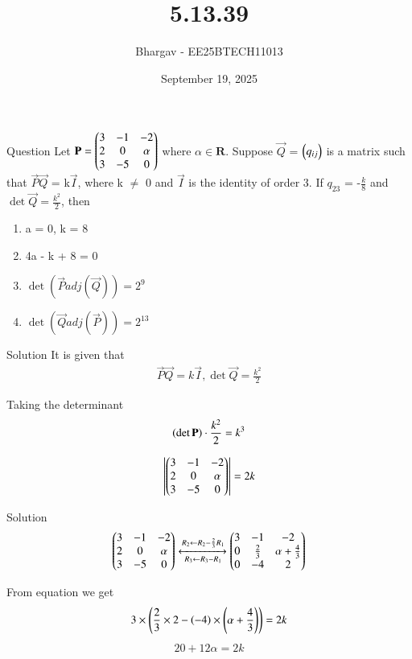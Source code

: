 \documentclass{beamer}
\title{5.13.39}
\date{September 19, 2025}
\author{Bhargav - EE25BTECH11013}
\begin{document}
\frame{\titlepage}
\begin{frame}{Question}
Let $\mathbf{P} = \begin{pmatrix}3 & -1 & -2 \\ 2 & 0 & \alpha \\ 3 & -5 & 0\end{pmatrix}$ where $\alpha \in \mathbf{R}$. Suppose $\vec{Q}$ = $\begin{pmatrix}q_{ij}\end{pmatrix}$ is a matrix such that $\vec{P}\vec{Q}$ = k$\vec{I}$, where k $\neq$ 0 and $\vec{I}$ is the identity of order 3. If $q_{23}$ = -$\frac{k}{8}$ and $\det{\vec{Q}} = \frac{k^2}{2}$, then 
\begin{enumerate}
\item a = 0, k = 8
\item 4a - k + 8 = 0
\item $\det{(\vec{P} adj(\vec{Q}))} = 2^9$
\item $\det{(\vec{Q} adj(\vec{P}))} = 2^{13}$
\end{enumerate}
\end{frame}

\begin{frame}{Solution}
It is given that
\begin{align}
\vec{P}\vec{Q} = k\vec{I}, \det{\vec{Q}} = \frac{k^2}{2}
\end{align}

Taking the determinant
\begin{align}
\left(\det{\mathbf{P}}\right) \cdot \frac{k^2}{2} = k^3
\end{align}

\begin{align}
\left\vert\begin{pmatrix}3 & -1 & -2 \\ 2 & 0 & \alpha \\ 3 & -5 & 0\end{pmatrix}\right\vert = 2k
\end{align}    
\end{frame}

\begin{frame}{Solution}
\begin{align}
\begin{pmatrix}3 & -1 & -2 \\ 2 & 0 & \alpha \\ 3 & -5 & 0\end{pmatrix} \xleftrightarrow[R_3 \leftarrow R_3 - R_1]{R_2 \leftarrow R_2 - \frac{2}{3}R_1}\begin{pmatrix}3 & -1 & -2 \\ 0 & \frac{2}{3} & \alpha + \frac{4}{3} \\ 0 & -4 & 2\end{pmatrix}
\end{align}

From equation  we get
\begin{align}
3 \times \left(\frac{2}{3}\times 2 - \left(-4\right) \times \left(\alpha + \frac{4}{3}\right)\right) = 2k
\end{align}
\begin{align}
20 + 12\alpha = 2k
\end{align}
\end{frame}
\end{document}
